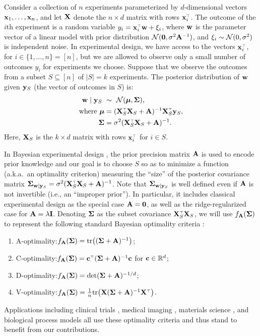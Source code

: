 \documentclass[thesis.tex]{subfiles}
\begin{document}
Consider a collection of $n$ experiments parameterized by
$d$-dimensional vectors $\mathbf x_1,\dots,\mathbf x_n$, and let $\mathbf X$ denote the
$n\times d$ matrix with rows $\x_i^\top$. The outcome of the $i$th
experiment is a random variable $y_i = \x_i^\top\w + \xi_i$, where
$\mathbf w$ is the parameter vector of a linear model with prior distribution
$\mathcal{N}(\mathbf 0,\sigma^2\mathbf A^{-1})$, and $\xi_i\sim \mathcal{N}(0,\sigma^2)$ is
independent noise. In experimental design, we have access to the vectors 
$\x_i^\top$, for $i\in\{1,\ldots,n\} = [n]$, but we are allowed to
observe only a small number of outcomes $y_i$ for experiments we choose.
Suppose that we observe the outcomes from a subset
$S\subseteq [n]$ of $\lvert S \vert = k$ experiments. The
posterior distribution of $\mathbf w$ given $\mathbf y_S$ (the vector of outcomes in $S$) is:
\begin{align*}
  \w\mid \y_S \ &\sim\ \Nc(\mub, \Sigmab), \\
  \text{where } \mub &= (\X_S^\top\X_S + \A)^{-1}\X_S^\top\y_S, \\
  \Sigmab &= \sigma^2(\X_S^\top\X_S+\A)^{-1}.
\end{align*}
Here, $\mathbf X_S$ is the $k\times d$ matrix with rows $\x_i^\top$ for
$i\in S$.

In Bayesian experimental design \citep{bayesian-design-review},
the prior precision matrix $\mathbf A$ is used to encode prior knowledge
and our goal is to choose $S$ so as to 
  minimize a function (a.k.a.~an optimality criterion) measuring the ``size''
  of the posterior covariance matrix
  $\Sigmab_{\w\mid\y_S} = \sigma^2(\X_S^\top\X_S+\A)^{-1}$.
Note that $\mathbf{\Sigma}_{\mathbf w\mid\mathbf y_S}$ is well defined even if $\mathbf A$ is not
invertible (i.e., an ``improper prior''). In particular, it includes classical
experimental design as the special case $\mathbf A = \mathbf 0$, as well as
the ridge-regularized case for $\mathbf A=\lambda\mathbf I$.
Denoting $\mathbf{\Sigma}$ as the subset covariance $\X_S^\top\X_S$, we will
use $f_{\mathbf A}(\mathbf{\Sigma})$ to represent the following standard Bayesian 
optimality criteria \citep{bayesian-design-review,optimal-design-pukelsheim}:
\begin{enumerate}
\item A-optimality:\quad $f_{\mathbf A}(\mathbf{\Sigma}) = \mathrm{tr}\big((\mathbf{\Sigma}+\mathbf A)^{-1}\big)$;
\item C-optimality:\quad \!\!$f_{\A}(\Sigmab) = \cb^\top(\Sigmab+\A)^{-1}\cb$ for
$\mathbf{c} \in \mathbb R^d$;
\item D-optimality:\quad $f_{\mathbf A}(\mathbf{\Sigma}) = \det(\mathbf{\Sigma}+\mathbf A)^{-1/d}$;
  \item V-optimality:\quad $f_{\A}(\Sigmab) =
    \frac1n\tr\big(\X(\Sigmab+\A)^{-1}\X^\top\big)$.
  \end{enumerate}
  Applications including clinical trials
  \citep{ryan2015fully,ding2008bayesian,spiegelhalter2004incorporating,berry2002adaptive,stangl1998bayesian,flournoy1993clinical},
  medical imaging \citep{owen2016optimisation},
  materials science
  \citep{frazier2016bayesian,ueno2016combo,terejanu2012bayesian},
 and biological process models \citep{ryan2016optimal}
  all use these optimality criteria and thus stand to benefit from
  our contributions.
\end{document}
